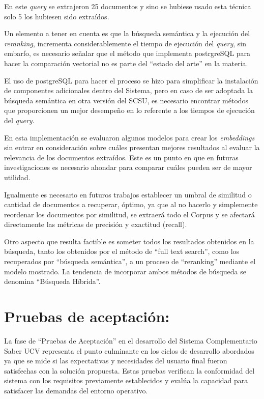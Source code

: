 \documentclass[
  12pt,
  openany]{book}
\begin{document}
En este \emph{query} se extrajeron 25 documentos y sino se hubiese usado esta técnica solo 5 los hubiesen sido extraídos.

Un elemento a tener en cuenta es que la búsqueda semántica y la ejecución del \emph{reranking}, incrementa considerablemente el tiempo de ejecución del \emph{query}, sin embarfo, es necesario señalar que el método que implementa postrgreSQL para hacer la comparación vectorial no es parte del ``estado del arte'' en la materia.

El uso de postgreSQL para hacer el proceso se hizo para simplificar la instalación de componentes adicionales dentro del Sistema, pero en caso de ser adoptada la búsqueda semántica en otra versión del SCSU, es necesario encontrar métodos que proporcionen un mejor desempeño en lo referente a los tiempos de ejecución del \emph{query}.

En esta implementación se evaluaron algunos modelos para crear los \emph{embeddings} sin entrar en consideración sobre cuáles presentan mejores resultados al evaluar la relevancia de los documentos extraídos. Este es un punto en que en futuras investigaciones es necesario ahondar para comparar cuáles pueden ser de mayor utilidad.

Igualmente es necesario en futuros trabajos establecer un umbral de similitud o cantidad de documentos a recuperar, óptimo, ya que al no hacerlo y simplemente reordenar los documentos por similitud, se extraerá todo el Corpus y se afectará directamente las métricas de precisión y exactitud (recall).

Otro aspecto que resulta factible es someter todos los resultados obtenidos en la búsqueda, tanto los obtenidos por el método de ``full text search'', como los recuperados por ``búsqueda semántica'', a un proceso de ``reranking'' mediante el modelo mostrado. La tendencia de incorporar ambos métodos de búsqueda se denomina ``Búsqueda Híbrida''.

\newpage

\hypertarget{pruebas}{%
\section{Pruebas de aceptación:}\label{pruebas}}

La fase de ``Pruebas de Aceptación'' en el desarrollo del Sistema Complementario Saber UCV representa el punto culminante en los ciclos de desarrollo abordados ya que se mide si las expectativas y necesidades del usuario final fueron satisfechas con la solución propuesta. Estas pruebas verifican la conformidad del sistema con los requisitos previamente establecidos y evalúa la capacidad para satisfacer las demandas del entorno operativo.
\end{document}

